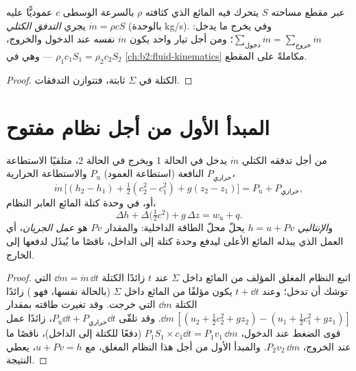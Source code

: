 \begin{proposition}\label{prop:b2:open-systems:mass}
عبر مقطع مساحته $S$ يتحرك فيه المائع الذي كثافته $\rho$
بالسرعة الوسطى $c$ عموديًّا عليه يجري \emph{التدفق
الكتلي} $\dot m = \rho c S$ (بالوحدة \unit{kg/s}). وفي
 يخرج ما يدخل: $\sum_{\text{دخول}}\dot m = \sum_{\text{خروج}}
\dot m$؛ ومن أجل تيار واحد يكون $\dot m$ نفسه عند الدخول والخروج،
$\rho_1c_1S_1 = \rho_2c_2S_2$ --- وهي  في
\cref{ch:b2:fluid-kinematics} مكاملةً على المقطع.
\end{proposition}

\begin{proof}
الكتلة في $\Sigma$ ثابتة، فتتوازن التدفقات.
\end{proof}

\section{المبدأ الأول من أجل نظام مفتوح}

\begin{theorem}\label{thm:b2:open-systems:firstlaw}
من أجل  تدفقه الكتلي $\dot m$ يدخل في الحالة 1
ويخرج في الحالة 2، متلقيًا الاستطاعة النافعة (استطاعة العمود)
$P_{\text{u}}$ والاستطاعة الحرارية $P_{\text{حراري}}$،
\[
\dot m\,\Big[(h_2 - h_1) + \tfrac12(c_2^2 - c_1^2) + g(z_2 - z_1)\Big]
= P_{\text{u}} + P_{\text{حراري}} ,
\]
أو، في وحدة كتلة المائع العابر النظام،
\[
\Delta h + \Delta\big(\tfrac12c^2\big) + g\,\Delta z = w_{\text{u}} + q .
\]
و\emph{الإنتالبي} $h = u + Pv$ يحلّ محلّ
الطاقة الداخلية: والمقدار $Pv$ هو \emph{عمل الجريان}، أي العمل الذي يبذله
المائع الأعلى ليدفع وحدة كتلة إلى الداخل، ناقصًا ما يُبذَل لدفعها
إلى الخارج.
\end{theorem}

\begin{proof}
اتبع النظام المغلق المؤلف من المائع داخل $\Sigma$ عند $t$ زائدًا
الكتلة $\dd m = \dot m\,\dd t$ التي توشك أن تدخل؛ وعند $t + \dd t$ يكون
مؤلفًا من المائع داخل $\Sigma$ (بالحالة نفسها، فهو ) زائدًا
الكتلة $\dd m$ التي خرجت. وقد تغيرت طاقته بمقدار
$\dd m\,[(u_2 + \tfrac12c_2^2 + gz_2) - (u_1 + \tfrac12c_1^2 + gz_1)]$. وقد
تلقّى $P_{\text{u}}\dd t + P_{\text{حراري}}\dd t$، زائدًا عمل
قوى الضغط عند الدخول، $P_1S_1 \times c_1\dd t = P_1v_1\,\dd m$
(دفعًا للكتلة إلى الداخل)، ناقصًا ما عند الخروج، $P_2v_2\,\dd m$. والمبدأ
الأول من أجل هذا النظام المغلق، مع $u + Pv = h$، يعطي النتيجة.
\end{proof}


